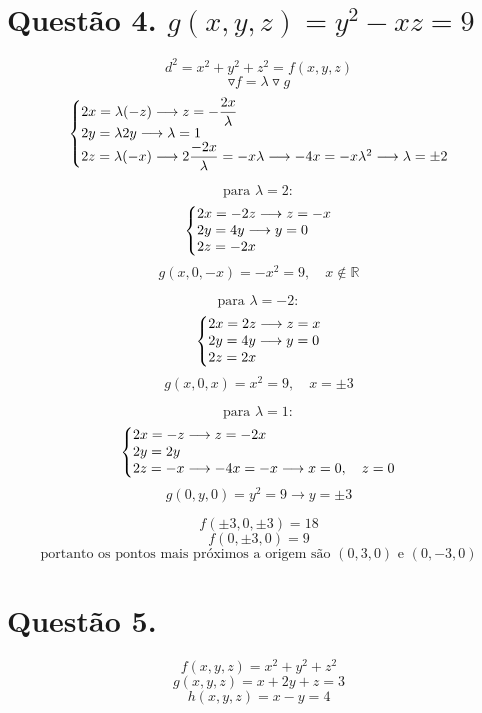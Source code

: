 \documentclass[12pt]{article}
\begin{document}
\section{Questão 4. $g(x,y,z) = y^{2}-xz=9$}

\[d^{2} = x^{2}+y^{2}+z^{2} = f(x,y,z)\]
\[\triangledown f = \lambda \triangledown g\]
\[\left\{\begin{array}{@{}l@{}}
	2x = \lambda(-z) \longrightarrow z = -\dfrac{2x}{\lambda}\\
	2y = \lambda2y \longrightarrow \lambda = 1\\
	2z = \lambda(-x) \longrightarrow 2\dfrac{-2x}{\lambda} = -x\lambda \longrightarrow -4x=-x\lambda^{2} \longrightarrow \lambda = \pm 2
\end{array} \right.\]

\[\text{para } \lambda = 2:\]
\[\left\{\begin{array}{@{}l@{}}
	2x = -2z \longrightarrow z = -x\\
	2y = 4y \longrightarrow y = 0 \\
	2z = -2x
\end{array} \right.\]
\[g(x,0,-x) = -x^{2} = 9, \quad x \notin \mathds{R}\]

\[\text{para } \lambda = -2:\]
\[\left\{\begin{array}{@{}l@{}}
	2x = 2z \longrightarrow z = x\\
	2y = 4y \longrightarrow y = 0 \\
	2z = 2x
\end{array} \right.\]
\[g(x,0,x) = x^{2} = 9, \quad x = \pm 3\]

\[\text{para } \lambda = 1:\]
\[\left\{\begin{array}{@{}l@{}}
	2x = -z \longrightarrow z = -2x\\
	2y = 2y \\
	2z = -x \longrightarrow -4x = -x \longrightarrow x=0, \quad z=0
\end{array} \right.\]
\[g(0,y,0) = y^{2}=9 \longrightarrow y = \pm 3\]

\[f(\pm3,0,\pm3) = 18\]
\[f(0,\pm 3,0) = 9\]
\[\text{portanto os pontos mais próximos a origem são }(0,3,0) \text{ e } (0,-3,0)\]

\section{Questão 5.}

\[f(x,y,z) = x^{2}+y^{2}+z^{2}\]
\[g(x,y,z) = x+2y+z=3\]
\[h(x,y,z) = x-y=4\]
\end{document}

